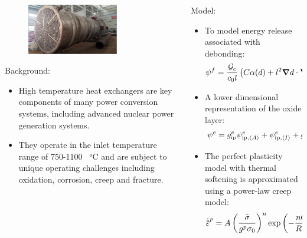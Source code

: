 \begin{frame}
  \vspace{-1.5em}
  \begin{columns}[T]
    \begin{column}{0.5\textwidth}
      \begin{figure}
        \centering
        \includegraphics[width=0.7\textwidth]{Chapter345/figures/HTHX}
      \end{figure}
      
      Background:
      \begin{itemize}
        \item High temperature heat exchangers are key components of many power conversion systems, including advanced nuclear power generation systems.
        \item They operate in the inlet temperature range of 750-1100 \SI{}{\celsius} and are subject to unique operating challenges including oxidation, corrosion, creep and fracture.
      \end{itemize}
    \end{column}
    \begin{column}{0.5\textwidth}
      Model:
      \begin{itemize}
        \item To model energy release associated with debonding:
              \begin{align*}
                \psi^f = \dfrac{{\mathcal{G}_c}}{c_0 l} \left( C\alpha(d) + l^2 \boldsymbol{\nabla} d \cdot \boldsymbol{\nabla} d \right) + \dfrac{1}{\tau} \mathcal{G} \omega(c).
              \end{align*}
        \item A lower dimensional representation of the oxide layer:
              \begin{align*}
                \psi^e & =  g^e_\text{ip} \psi^e_{\text{ip}, {\left< A \right>}} + \psi^e_{\text{ip}, {\left< I \right>}} + g^e_\text{op} \psi^e_{\text{op}, {\left< A \right>}} + \psi^e_{\text{ip}, {\left< I \right>}}. 
              \end{align*}
        \item The perfect plasticity model with thermal softening is approximated using a power-law creep model:
              \begin{align*}
                \epdot = A \left( \dfrac{\bar{\sigma}}{g^p \sigma_0} \right)^n \exp\left( -\dfrac{nQ}{RT} \right).
              \end{align*}
      \end{itemize}
    \end{column}
  \end{columns}
\end{frame}

